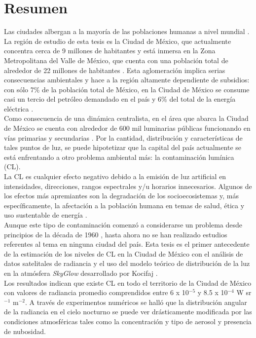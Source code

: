 \chapter{Resumen}

Las ciudades albergan a la mayoría de las poblaciones humanas a nivel mundial \citep{Zari2018}. La región de estudio de esta tesis es la Ciudad de México, que actualmente concentra cerca de 9 millones de habitantes \citep{INEGI2015} y está inmersa en la Zona Metropolitana del Valle de México, que cuenta con una población total de alrededor de 22 millones de habitantes \citep{OCDE2015}. Esta aglomeración implica serias consecuencias ambientales y hace a la región altamente dependiente de subsidios: con sólo 7\% de la población total de México, en la Ciudad de México se consume casi un tercio del petróleo demandado en el país y 6\% del total de la energía eléctrica \citep{SENER2013}.\\

Como consecuencia de una dinámica centralista, en el área que abarca la Ciudad de México se cuenta con alrededor de 600 mil luminarias públicas funcionando en vías primarias y secundarias \citep{INFO2019}. Por la cantidad, distribución y características de tales puntos de luz, se puede hipotetizar que la capital del país actualmente se está enfrentando a otro problema ambiental más: la contaminación lumínica (CL).\\

La CL es cualquier efecto negativo debido a la emisión de luz artificial en intensidades, direcciones, rangos espectrales y/u horarios innecesarios. Algunos de los efectos más apremiantes son la degradación de los socioecosistemas y, más específicamente, la afectación a la población humana en temas de salud, ética y uso sustentable de energía \citep{AtlasREPSA, LibroCL, Stone2017}.\\

Aunque este tipo de contaminación comenzó a considerarse un problema desde principios de la década de 1960 \citep{LibroCL}, hasta ahora no se han realizado estudios referentes al tema en ninguna ciudad del país. Esta tesis es el primer antecedente de la estimación de los niveles de CL en la Ciudad de México con el análisis de datos satelitales de radiancia y el uso del modelo teórico de distribución de la luz en la atmósfera \textit{SkyGlow} desarrollado por Kocifaj \citep{Kocifaj2007}.\\

Los resultados indican que existe CL en todo el territorio de la Ciudad de México con valores de radiancia promedio comprendidos entre 6 x 10$^{-5}$ y 8.5 x 10$^{-4}$ W sr$^{-1}$ m$^{-2}$. A través de experimentos numéricos se halló que la distribución angular de la radiancia en el cielo nocturno se puede ver drásticamente modificada por las condiciones atmosféricas tales como la concentración y tipo de aerosol y presencia de nubosidad.\\

